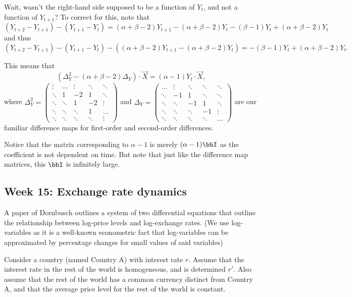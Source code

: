 \documentclass[a4paper, 12pt,oneside,openany]{book}
\begin{document}
Wait, wasn't the right-hand side supposed to be a function of $Y_t$, and not a function of $Y_{t+1}$? To correct for this, note that $$(Y_{t+2}-Y_{t+1})-(Y_{t+1}-Y_t)=(\alpha+\beta-2)Y_{t+1}-(\alpha+\beta-2)Y_t-(\beta-1) Y_t+(\alpha+\beta-2)Y_t$$ and thus $$(Y_{t+2}-Y_{t+1})-(Y_{t+1}-Y_t) - ((\alpha+\beta-2)Y_{t+1}-(\alpha+\beta-2)Y_t)=-(\beta-1) Y_t+(\alpha+\beta-2)Y_t. $$ 

This means that $$(\Delta^2_Y - (\alpha+\beta-2) \Delta_Y)\cdot \vec{X} = (\alpha-1)Y_t \cdot \vec{X},$$ where $\Delta^2_Y=\begin{pmatrix}\vdots&\hdots&\vdots&\ddots&\ddots \\ \ddots&1&-2&1&\ddots \\ \ddots&\ddots&1&-2&\vdots \\ \ddots&\ddots&\ddots&1&\hdots \\ \ddots&\ddots&\ddots&\ddots&\vdots \end{pmatrix}$ and $\Delta_Y=\begin{pmatrix}\hdots&\vdots&\ddots&\ddots&\ddots \\\ddots&-1&1&\ddots&\ddots \\ \ddots&\ddots&-1&1&\ddots \\ \ddots&\ddots&\ddots&-1&\vdots \\ \ddots&\ddots&\ddots&\ddots&\hdots \end{pmatrix}$ are our familiar difference maps for first-order and second-order differences.

Notice that the matrix corresponding to $\alpha-1$ is merely $(\alpha-1)\bbI$ as the coefficient is not dependent on time. But note that just like the difference map matrices, this $\bbI$ is infinitely large.

\subsection{Week 15: Exchange rate dynamics}

A paper of Dornbusch outlines a system of two differential equations that outline the relationship between log-price levels and log-exchange rates. (We use log-variables as it is a well-known econometric fact that log-variables can be approximated by percentage changes for small values of said variables)

Consider a country (named Country A) with interest rate $r$. Assume that the interest rate in the rest of the world is homogeneous, and is determined $r'$. Also assume that the rest of the world has a common currency distinct from Country A, and that the average price level for the rest of the world is constant. 
\end{document}
